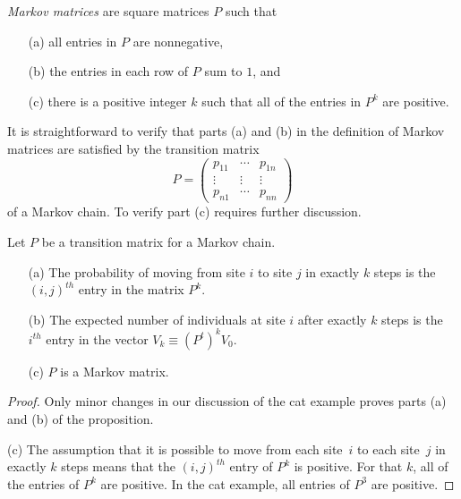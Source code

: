 \documentclass{ximera}
\begin{document}
\begin{definition}  \label{D:Markov}
{\em Markov matrices\/} are square matrices
$P$ such that
\begin{enumerate}
\item[(a)]  all entries in $P$ are nonnegative,
\item[(b)]  the entries in each row of $P$ sum to $1$, and
\item[(c)]  there is a positive integer $k$ such that all of the entries
	in $P^k$ are positive.
\end{enumerate}
\end{definition}

It is straightforward to verify that parts (a) and (b) in the definition of
Markov matrices are satisfied by the transition matrix
\[
P = \left(\begin{array}{ccc} p_{11} & \cdots & p_{1n} \\
	\vdots & \vdots & \vdots \\ p_{n1} & \cdots & p_{nn}
\end{array}\right)
\]
of a Markov chain.  To verify part (c) requires further discussion.

\begin{proposition}   \label{T:Markoveasy}
Let $P$ be a transition matrix for a
Markov chain.
\begin{enumerate}
\item[(a)]  The probability of moving from site $i$ to site $j$ in exactly
$k$ steps is the $(i,j)^{th}$ entry in the matrix $P^k$.
\item[(b)]  The expected number of individuals at site $i$ after exactly $k$
steps is the $i^{th}$ entry in the vector $V_k\equiv (P^t)^kV_0$.
\item[(c)]  $P$ is a Markov matrix.
\end{enumerate}
\end{proposition}

\begin{proof} Only minor changes in our discussion of the cat example proves parts
(a) and (b) of the proposition.

(c) The assumption that it is possible to move from each site~$i$ to each
site~$j$ in exactly $k$ steps means that the $(i,j)^{th}$ entry of $P^k$ is
positive.  For that $k$, all of the entries of $P^k$ are positive.  In the
cat example, all entries of $P^3$ are positive.  \end{proof}
\end{document}
